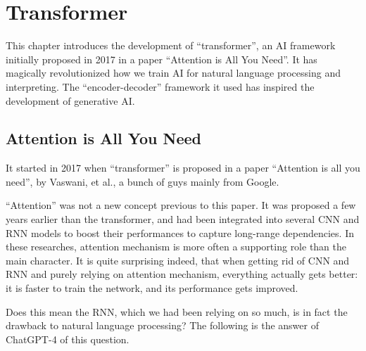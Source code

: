 \chapter{Transformer} \label{ch:transformer}

This chapter introduces the development of ``transformer'', an AI framework initially proposed in 2017 in a paper ``Attention is All You Need''. It has magically revolutionized how we train AI for natural language processing and interpreting. The ``encoder-decoder'' framework it used has inspired the development of generative AI.

\section{Attention is All You Need}

It started in 2017 when ``transformer'' is proposed in a paper ``Attention is all you need'', by Vaswani, et al., a bunch of guys mainly from Google.

``Attention'' was not a new concept previous to this paper. It was proposed a few years earlier than the transformer, and had been integrated into several CNN and RNN models to boost their performances to capture long-range dependencies. In these researches, attention mechanism is more often a supporting role than the main character. It is quite surprising indeed, that when getting rid of CNN and RNN and purely relying on attention mechanism, everything actually gets better: it is faster to train the network, and its performance gets improved.

Does this mean the RNN, which we had been relying on so much, is in fact the drawback to natural language processing? The following is the answer of ChatGPT-4 of this question.

